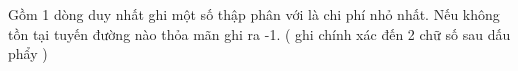 Gồm 1 dòng duy nhất ghi một số thập phân với là chi phí nhỏ nhất. Nếu không tồn tại tuyến đường nào thỏa mãn ghi ra -1. ( ghi chính xác đến 2 chữ số sau dấu phẩy )  

\